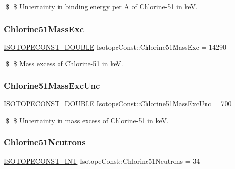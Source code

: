 \$ \$ Uncertainty in binding energy per A of Chlorine-\/51 in keV. \mbox{\label{group___isotope_const-_chlorine-_cl51_ga3e944455e8e4ed6335b387580598ba55}} 
\subsubsection{\texorpdfstring{Chlorine51\+Mass\+Exc}{Chlorine51MassExc}}
{\footnotesize\ttfamily \mbox{\hyperlink{group___isotope_const-_macros_ga8f45a7272ce02c0b4c65c44636ed719a}{I\+S\+O\+T\+O\+P\+E\+C\+O\+N\+S\+T\+\_\+\+D\+O\+U\+B\+LE}} Isotope\+Const\+::\+Chlorine51\+Mass\+Exc = 14290}

\$ \$ Mass excess of Chlorine-\/51 in keV. \mbox{\label{group___isotope_const-_chlorine-_cl51_ga15401550a30c8d6da437aba8acefc149}} 
\subsubsection{\texorpdfstring{Chlorine51\+Mass\+Exc\+Unc}{Chlorine51MassExcUnc}}
{\footnotesize\ttfamily \mbox{\hyperlink{group___isotope_const-_macros_ga8f45a7272ce02c0b4c65c44636ed719a}{I\+S\+O\+T\+O\+P\+E\+C\+O\+N\+S\+T\+\_\+\+D\+O\+U\+B\+LE}} Isotope\+Const\+::\+Chlorine51\+Mass\+Exc\+Unc = 700}

\$ \$ Uncertainty in mass excess of Chlorine-\/51 in keV. \mbox{\label{group___isotope_const-_chlorine-_cl51_ga46e4950bf64eefd720efa42c31f3bb97}} 
\subsubsection{\texorpdfstring{Chlorine51\+Neutrons}{Chlorine51Neutrons}}
{\footnotesize\ttfamily \mbox{\hyperlink{group___isotope_const-_macros_ga5f18360b3e99483a35c32d789e62621c}{I\+S\+O\+T\+O\+P\+E\+C\+O\+N\+S\+T\+\_\+\+I\+NT}} Isotope\+Const\+::\+Chlorine51\+Neutrons = 34}

